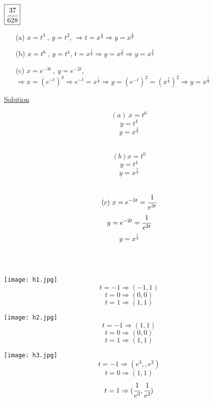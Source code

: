 \begin{example}
$\boxed{\cfrac{37}{628}}$\begin{enumerate}
    \item[(a)] $x=t^3~,~y=t^2$, {\color{red}$\Rightarrow t=x^\frac{1}{3}\Rightarrow y=x^\frac{2}{3}$}
    \item[(b)] $x=t^{6}~,~y=t^{4}$, {\color{red}$t=x^{\frac{1}{6}}\Rightarrow y=x^\frac{4}{6}\Rightarrow y=x^\frac{2}{3}$}
    \item[(c)] $x=e^{-3t}~,~y=e^{-2t}$, {\color{red}$\Rightarrow x=(e^{-t})^3\Rightarrow e^{-t}=x^\frac{1}{3}\Rightarrow y=(e^{-t})^2=(x^\frac{1}{3})^2\Rightarrow 
    y=x^\frac{2}{3}$}
    \end{enumerate}
    \underline{\textbf{\large}\color{smalt(darkpowderblue)}Solution} \\
    \begin{minipage}{0.1\textwidth}
$$(a) ~ x=t^6$$
$$y=t^4$$
$$y=x^\frac{2}{3}$$\\
\end{minipage} 
\begin{minipage}{0.62\textwidth}
$$(b)  x=t^6$$
$$y=t^4$$
$$y=x^\frac{2}{3}$$\\
\end{minipage} 
\begin{minipage}{0.18\textwidth}
$$(c)~x=e^{-3t}=\cfrac{1}{e^{3t}}$$
$$y=e^{-2t}=\cfrac{1}{e^{2t}}$$
$$y=x^\frac{2}{3}$$\\
\end{minipage}\\ 
\noindent\begin{minipage}{0.3\textwidth}
\texttt{[image: h1.jpg]}
$$t=-1 \Rightarrow (-1,1) $$
$$t=0 \Rightarrow (0,0)$$
$$t=1 \Rightarrow (1,1)$$
\end{minipage}
\noindent\begin{minipage}{0.4\textwidth}
\texttt{[image: h2.jpg]}
$$t=-1 \Rightarrow (1,1) $$
$$t=0 \Rightarrow (0,0)$$
$$t=1 \Rightarrow (1,1)$$
\end{minipage}
\noindent\begin{minipage}{0.3\textwidth}
\texttt{[image: h3.jpg]}
$$t=-1 \Rightarrow (e^3,,e^2) $$
$$t=0 \Rightarrow (1,1)$$
$$t=1 \Rightarrow (\cfrac{1}{e^3},\cfrac{1}{e^2})$$
\end{minipage}
\end{example}

